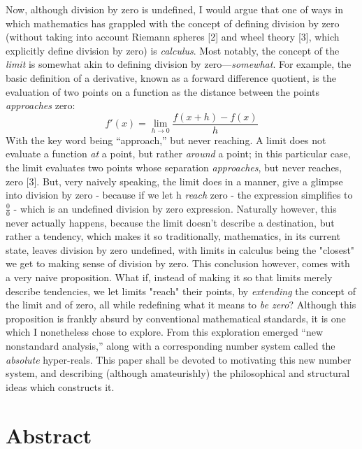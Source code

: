 \documentclass{article}
\begin{document}
Now, although division by zero is undefined, I would argue that one of ways in which  mathematics has grappled with the concept of defining division by zero (without taking into account Riemann spheres [2] and wheel theory [3], which explicitly define division by zero) is \textit{calculus}. Most notably, the concept of the \textit{limit} is somewhat akin to defining division by zero—\textit{somewhat}. For example, the basic definition of a derivative, known as a forward difference quotient, is the evaluation of two points on a function as the distance between the points \textit{approaches} zero:
\[
f'(x) = \lim_{h \to 0} \frac{f(x+h) - f(x)}{h}
\]With the key word being ``approach,'' but never reaching. A limit does not evaluate a function \textit{at} a point, but rather \textit{around} a point; in this particular case, the limit evaluates two points whose separation \textit{approaches}, but never reaches, zero [3]. But, very naively speaking, the limit does in a manner, give a glimpse into division by zero - because if we let h \textit{reach} zero - the expression simplifies to $\frac{0}{0}$ - which is an undefined division by zero expression. Naturally however, this never actually happens, because the limit doesn't describe a destination, but rather a tendency, which makes it so traditionally, mathematics, in its current state, leaves division by zero undefined, with limits in calculus being the "closest" we get to making sense of division by zero. This conclusion however, comes with a very naive proposition. What if, instead of making it so that limits merely describe tendencies, we let limits "reach" their points, by \textit{extending} the concept of the limit and of zero, all while redefining what it means to \textit{be zero}? Although this proposition is frankly absurd by conventional mathematical standards, it is one which I nonetheless chose to explore. From this exploration emerged ``new nonstandard analysis,'' along with a corresponding number system called the \textit{absolute} hyper-reals. This paper shall be devoted to motivating this new number system, and describing (although amateurishly) the philosophical and structural ideas which constructs it. 
\newpage\section{Abstract}
\end{document}
